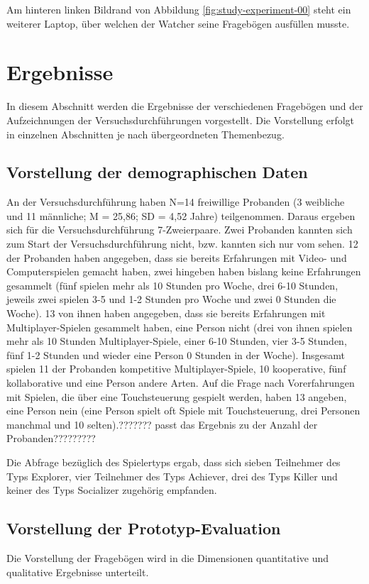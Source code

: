 Am hinteren linken Bildrand von Abbildung \ref{fig:study-experiment-00} steht ein weiterer Laptop, über welchen der Watcher seine Fragebögen ausfüllen musste.

\section{Ergebnisse}
In diesem Abschnitt werden die Ergebnisse der verschiedenen Fragebögen und der Aufzeichnungen der Versuchsdurchführungen vorgestellt.
Die Vorstellung erfolgt in einzelnen Abschnitten je nach übergeordneten Themenbezug.



\subsection{Vorstellung der demographischen Daten}
An der Versuchsdurchführung haben N=14 freiwillige Probanden (3 weibliche und 11 männliche; M = 25,86; SD = 4,52 Jahre) teilgenommen. Daraus ergeben sich für die Versuchsdurchführung 7-Zweierpaare. Zwei Probanden kannten sich zum Start der Versuchsdurchführung nicht, bzw. kannten sich nur vom sehen. 12 der Probanden haben angegeben, dass sie bereits Erfahrungen mit Video- und Computerspielen gemacht haben, zwei hingeben haben bislang keine Erfahrungen gesammelt (fünf spielen mehr als 10 Stunden pro Woche, drei 6-10 Stunden, jeweils zwei spielen 3-5 und 1-2 Stunden pro Woche und zwei 0 Stunden die Woche). 13 von ihnen haben angegeben, dass sie bereits Erfahrungen mit Multiplayer-Spielen gesammelt haben, eine Person nicht (drei von ihnen spielen mehr als 10 Stunden Multiplayer-Spiele, einer 6-10 Stunden, vier 3-5 Stunden, fünf 1-2 Stunden und wieder eine Person 0 Stunden in der Woche). Insgesamt spielen 11 der Probanden kompetitive Multiplayer-Spiele, 10 kooperative, fünf kollaborative und eine Person andere Arten.
Auf die Frage nach Vorerfahrungen mit Spielen, die über eine Touchsteuerung gespielt werden, haben 13  angeben, eine Person nein (eine Person spielt oft Spiele mit Touchsteuerung, drei Personen manchmal und 10 selten).???????  passt das Ergebnis zu der Anzahl der Probanden?????????

Die Abfrage bezüglich des Spielertyps ergab, dass sich sieben Teilnehmer des Typs Explorer, vier Teilnehmer des Typs Achiever, drei des Typs Killer und keiner des Typs Socializer zugehörig empfanden.

\subsection{Vorstellung der Prototyp-Evaluation}
Die Vorstellung der Fragebögen wird in die Dimensionen quantitative und qualitative Ergebnisse unterteilt.

